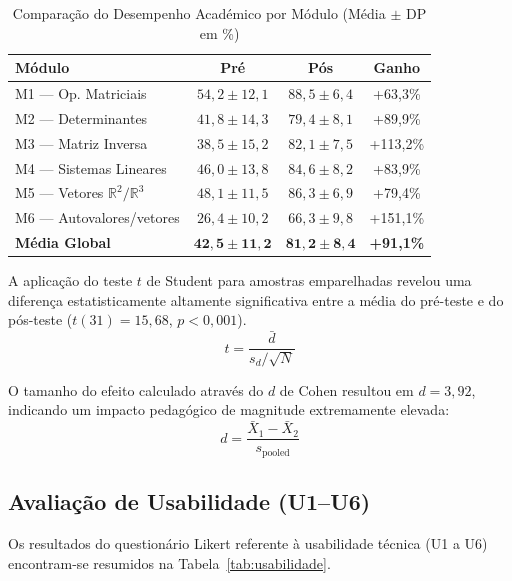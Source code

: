 \documentclass[conference]{IEEEtran}
\begin{document}
\begin{table}[htbp]
\caption{Comparação do Desempenho Académico por Módulo (Média $\pm$ DP em \%)}
\label{tab:desempenho}
\centering
\footnotesize
\begin{tabular}{|p{2.3cm}|c|c|c|}
\hline
\textbf{Módulo} & \textbf{Pré} & \textbf{Pós} & \textbf{Ganho} \\
\hline
M1 --- Op. Matriciais & $54{,}2 \pm 12{,}1$ & $88{,}5 \pm 6{,}4$ & +63,3\% \\
\hline
M2 --- Determinantes & $41{,}8 \pm 14{,}3$ & $79{,}4 \pm 8{,}1$ & +89,9\% \\
\hline
M3 --- Matriz Inversa & $38{,}5 \pm 15{,}2$ & $82{,}1 \pm 7{,}5$ & +113,2\% \\
\hline
M4 --- Sistemas Lineares & $46{,}0 \pm 13{,}8$ & $84{,}6 \pm 8{,}2$ & +83,9\% \\
\hline
M5 --- Vetores $\mathbb{R}^2/\mathbb{R}^3$ & $48{,}1 \pm 11{,}5$ & $86{,}3 \pm 6{,}9$ & +79,4\% \\
\hline
M6 --- Autovalores/vetores & $26{,}4 \pm 10{,}2$ & $66{,}3 \pm 9{,}8$ & +151,1\% \\
\hline
\textbf{Média Global} & $\mathbf{42{,}5 \pm 11{,}2}$ & $\mathbf{81{,}2 \pm 8{,}4}$ & \textbf{+91,1\%} \\
\hline
\end{tabular}
\end{table}

A aplicação do teste $t$ de Student para amostras emparelhadas revelou uma diferença estatisticamente altamente significativa entre a média do pré-teste e do pós-teste ($t(31) = 15{,}68$, $p < 0{,}001$).
\begin{equation}
t = \frac{\bar{d}}{s_d / \sqrt{N}}
\label{eq:teste-t}
\end{equation}

O tamanho do efeito calculado através do $d$ de Cohen resultou em $d = 3{,}92$, indicando um impacto pedagógico de magnitude extremamente elevada:
\begin{equation}
d = \frac{\bar{X}_1 - \bar{X}_2}{s_{\text{pooled}}}
\label{eq:cohen}
\end{equation}

\subsection{Avaliação de Usabilidade (U1--U6)}

Os resultados do questionário Likert referente à usabilidade técnica (U1 a U6) encontram-se resumidos na Tabela~\ref{tab:usabilidade}.
\end{document}
